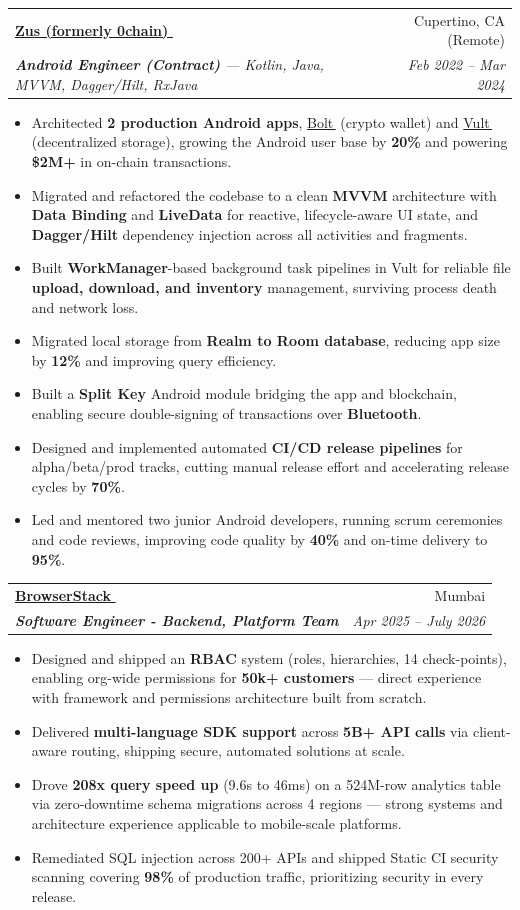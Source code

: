 \documentclass[letterpaper,10pt]{article}
\makeatletter
\let\orighref\href
\renewcommand{\href}[2]{\orighref{#1}{#2\tiny\,\faExternalLink\normalsize}}
\newcommand{\resumeItem}[1]{
  \item\small{
    #1 \vspace{-2.5pt}
  }
}
\newcommand{\resumeSubheading}[4]{
  \item
    \begin{tabular*}{0.97\textwidth}{l@{\extracolsep{\fill}}r}
      \textbf{#1} & #2 \\
      \textit{\small#3} & \textit{\small #4} \\
    \end{tabular*}
}
\newcommand{\resumeItemListStart}{\vspace{0pt}\begin{itemize}[leftmargin=8pt,itemsep=1pt,parsep=0pt]
  \selectfont\small
  \setlength\itemsep{1pt}
  \setlength\parsep{0em}
  }
\newcommand{\resumeItemListEnd}{\end{itemize}}
\makeatother
\begin{document}
\resumeSubheading
{\href{https://zus.network/?v=1}{Zus (formerly 0chain)}}{Cupertino, CA (Remote)}
{\textbf{Android Engineer (Contract)} --- Kotlin, Java, MVVM, Dagger/Hilt, RxJava}{Feb 2022 -- Mar 2024}
\resumeItemListStart
\resumeItem{Architected \textbf{2 production Android apps}, \href{https://bolt.holdings/}{Bolt} (crypto wallet) and \href{https://play.google.com/store/apps/details?id=network.zus.vultbox.prod}{Vult} (decentralized storage), growing the Android user base by \textbf{20\%} and powering \textbf{\$2M+} in on-chain transactions.}
\resumeItem{Migrated and refactored the codebase to a clean \textbf{MVVM} architecture with \textbf{Data Binding} and \textbf{LiveData} for reactive, lifecycle-aware UI state, and \textbf{Dagger/Hilt} dependency injection across all activities and fragments.}
\resumeItem{Built \textbf{WorkManager}-based background task pipelines in Vult for reliable file \textbf{upload, download, and inventory} management, surviving process death and network loss.}
\resumeItem{Migrated local storage from \textbf{Realm to Room database}, reducing app size by \textbf{12\%} and improving query efficiency.}
\resumeItem{Built a \textbf{Split Key} Android module bridging the app and blockchain, enabling secure double-signing of transactions over \textbf{Bluetooth}.}
\resumeItem{Designed and implemented automated \textbf{CI/CD release pipelines} for alpha/beta/prod tracks, cutting manual release effort and accelerating release cycles by \textbf{70\%}.}
\resumeItem{Led and mentored two junior Android developers, running scrum ceremonies and code reviews, improving code quality by \textbf{40\%} and on-time delivery to \textbf{95\%}.}
\resumeItemListEnd

\resumeSubheading
{\href{https://browserstack.com}{BrowserStack}}{Mumbai}
{\textbf{Software Engineer - Backend, Platform Team}}{Apr 2025 -- July 2026}
\resumeItemListStart
\resumeItem{Designed and shipped an \textbf{RBAC} system (roles, hierarchies, 14 check-points), enabling org-wide permissions for \textbf{50k+ customers} --- direct experience with framework and permissions architecture built from scratch.}
\resumeItem{Delivered \textbf{multi-language SDK support} across \textbf{5B+ API calls} via client-aware routing, shipping secure, automated solutions at scale.}
\resumeItem{Drove \textbf{208x query speed up} (9.6s to 46ms) on a 524M-row analytics table via zero-downtime schema migrations across 4 regions --- strong systems and architecture experience applicable to mobile-scale platforms.}
\resumeItem{Remediated SQL injection across 200+ APIs and shipped Static CI security scanning covering \textbf{98\%} of production traffic, prioritizing security in every release.}
\resumeItemListEnd
\end{document}
